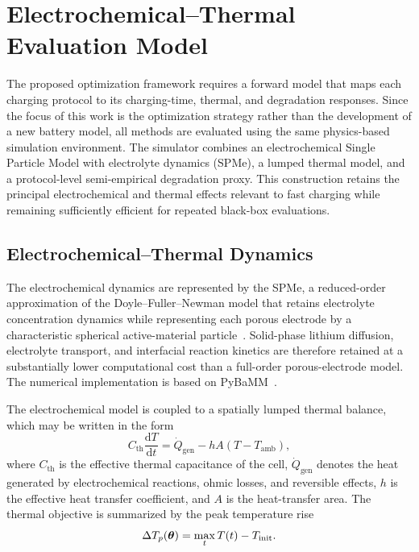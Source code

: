 \section{Electrochemical--Thermal Evaluation Model}
\label{sec:model}

The proposed optimization framework requires a forward model that maps each
charging protocol to its charging-time, thermal, and degradation responses.
Since the focus of this work is the optimization strategy rather than the
development of a new battery model, all methods are evaluated using the same
physics-based simulation environment. The simulator combines an
electrochemical Single Particle Model with electrolyte dynamics (SPMe), a
lumped thermal model, and a protocol-level semi-empirical degradation proxy.
This construction retains the principal electrochemical and thermal effects
relevant to fast charging while remaining sufficiently efficient for repeated
black-box evaluations.

\subsection{Electrochemical--Thermal Dynamics}

The electrochemical dynamics are represented by the SPMe, a reduced-order
approximation of the Doyle--Fuller--Newman model that retains electrolyte
concentration dynamics while representing each porous electrode by a
characteristic spherical active-material particle~\cite{ref6}. Solid-phase
lithium diffusion, electrolyte transport, and interfacial reaction kinetics are
therefore retained at a substantially lower computational cost than a
full-order porous-electrode model. The numerical implementation is based on
PyBaMM~\cite{ref7}.

The electrochemical model is coupled to a spatially lumped thermal balance,
which may be written in the form
\begin{equation}
C_{\mathrm{th}}\frac{\mathrm d T}{\mathrm d t}
=
\dot Q_{\mathrm{gen}}
-hA\left(T-T_{\mathrm{amb}}\right),
\label{eq:thermal}
\end{equation}
where $C_{\mathrm{th}}$ is the effective thermal capacitance of the cell,
$\dot Q_{\mathrm{gen}}$ denotes the heat generated by electrochemical
reactions, ohmic losses, and reversible effects, $h$ is the effective heat
transfer coefficient, and $A$ is the heat-transfer area. The thermal objective
is summarized by the peak temperature rise
\begin{equation}
\Delta T_p(\boldsymbol{\theta})
=
\max_t T(t)-T_{\mathrm{init}}.
\label{eq:temp_rise}
\end{equation}

